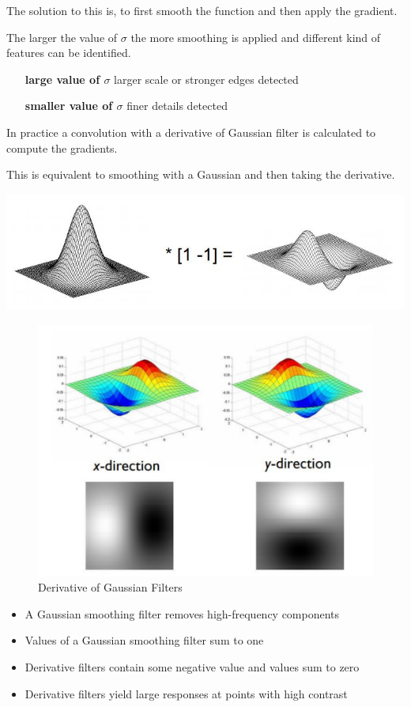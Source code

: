 \documentclass[11pt]{article}
\theoremstyle{definition}
\begin{document}
\noindent
The solution to this is, to first smooth the function and then apply the gradient.

The larger the value of $\sigma$ the more smoothing is applied and different kind of features can be identified.
\begin{itemize}[leftmargin=*, labelindent=3.5cm, labelsep=0.5cm]
	\item[\textbf{large value of $\sigma$}] larger scale or stronger edges detected
	\item[\textbf{smaller value of $\sigma$}] finer details detected
\end{itemize}

\noindent
\begin{minipage}{0.6\textwidth}
	In practice a convolution with a derivative of Gaussian filter is calculated to compute the gradients.
	
	This is equivalent to smoothing with a Gaussian and then taking the derivative.
\end{minipage}
\begin{minipage}{0.4\textwidth}
	\begin{center}
		\includegraphics[width=0.6\linewidth]{img/derivative_gaussian_filter}
	\end{center}
\end{minipage}

\begin{figure}[H]
	\centering
	\includegraphics[width=0.6\linewidth]{img/derivative_gaussian_filter2}
	\caption{Derivative of Gaussian Filters}
	\label{fig:derivativegaussianfilter2}
\end{figure}

\begin{itemize}
	\item A Gaussian smoothing filter removes high-frequency components
	\item Values of a Gaussian smoothing filter sum to one
	\item Derivative filters contain some negative value and values sum to zero
	\item Derivative filters yield large responses at points with high contrast
\end{itemize}
\end{document}
